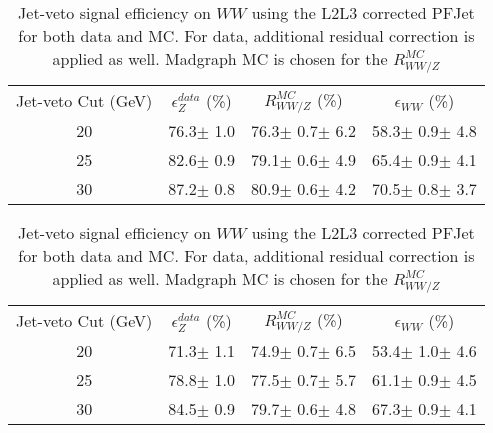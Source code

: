 \begin{table}[htbp]
\caption{Jet-veto signal efficiency on $WW$ using the uncorrected PFJet. Madgraph MC is chosen 
for the $R_{WW/Z}^{MC}$}
\begin{center}
\label{tab:wweff_results}
\begin{tabular}{c|cc|c}
\hline
\hline
Jet-veto Cut (GeV) & $\epsilon_Z^{data}$ (\%) & $R_{WW/Z}^{MC}$ (\%) & $\epsilon_{WW}$ (\%) \\
    20 &   76.3$\pm$ 1.0 &   76.3$\pm$ 0.7$\pm$ 6.2 &   58.3$\pm$ 0.9$\pm$ 4.8 \\
    25 &   82.6$\pm$ 0.9 &   79.1$\pm$ 0.6$\pm$ 4.9 &   65.4$\pm$ 0.9$\pm$ 4.1 \\
    30 &   87.2$\pm$ 0.8 &   80.9$\pm$ 0.6$\pm$ 4.2 &   70.5$\pm$ 0.8$\pm$ 3.7 \\
\hline
\hline
\end{tabular}
\end{center}
\caption{Jet-veto signal efficiency on $WW$ using the L2L3 corrected PFJet for both data and MC. 
For data, additional residual correction is applied as well. 
Madgraph MC is chosen for the $R_{WW/Z}^{MC}$}
\begin{center}
\label{tab:wweff_jec_results}
\begin{tabular}{c|cc|c}
\hline
\hline
Jet-veto Cut (GeV) & $\epsilon_Z^{data}$ (\%) & $R_{WW/Z}^{MC}$ (\%) & $\epsilon_{WW}$ (\%) \\
    20 &   71.3$\pm$ 1.1 &   74.9$\pm$ 0.7$\pm$ 6.5 &   53.4$\pm$ 1.0$\pm$ 4.6 \\
    25 &   78.8$\pm$ 1.0 &   77.5$\pm$ 0.7$\pm$ 5.7 &   61.1$\pm$ 0.9$\pm$ 4.5 \\
    30 &   84.5$\pm$ 0.9 &   79.7$\pm$ 0.6$\pm$ 4.8 &   67.3$\pm$ 0.9$\pm$ 4.1 \\
\hline
\hline
\end{tabular}
\end{center}
\end{table}
